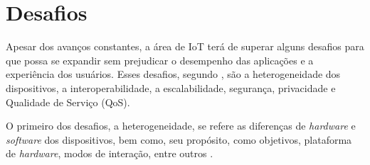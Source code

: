 







\section{Desafios}

Apesar dos avanços constantes, a área de IoT terá de superar alguns desafios para que possa se expandir sem prejudicar o desempenho das aplicações e a experiência dos usuários. Esses desafios, segundo , são a heterogeneidade dos dispositivos, a interoperabilidade, a escalabilidade, segurança, privacidade e Qualidade de Serviço (QoS).

O primeiro dos desafios, a heterogeneidade, se refere as diferenças de \textit{hardware} e \textit{software} dos dispositivos, bem como, seu propósito, como objetivos, plataforma de \textit{hardware}, modos de interação, entre outros \cite{Hussain2016}. %

